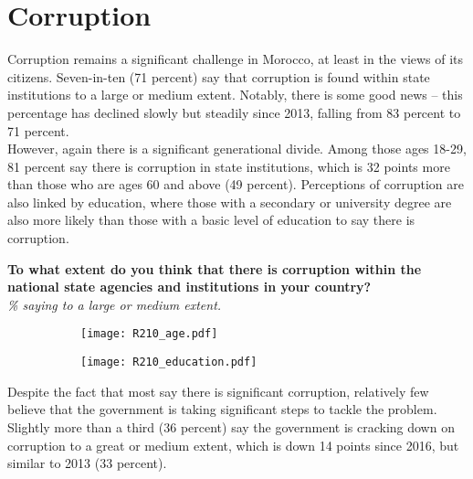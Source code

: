 \documentclass[12pt]{article}
\begin{document}
\section*{Corruption}

	\noindent Corruption remains a significant challenge in Morocco, at least in the views of its citizens. Seven-in-ten (71 percent) say that corruption is found within state institutions to a large or medium extent. Notably, there is some good news -- this percentage has declined slowly but steadily since 2013, falling from 83 percent to 71 percent.\\
	
	\noindent However, again there is a significant generational divide. Among those ages 18-29, 81 percent say there is corruption in state institutions, which is 32 points more than those who are ages 60 and above (49 percent). Perceptions of corruption are also linked by education, where those with a secondary or university degree are also more likely than those with a basic level of education to say there is corruption.
	
	\pagebreak
	\begin{center}
		{\textbf{To what extent do you think that there is corruption within the national state agencies and institutions in your country?}}\\
		\emph{\% saying to a large or medium extent.}
	\end{center}
	\begin{figure}[H]
		\hspace{-1cm}\begin{minipage}{0.5\linewidth}
			\begin{figure}[H]
				\centering
				\texttt{[image: R210\_age.pdf]} 
			\end{figure}
		\end{minipage}
		\begin{minipage}{0.4\linewidth}
			\begin{figure}[H]
				\texttt{[image: R210\_education.pdf]}
			\end{figure}
		\end{minipage}
	\end{figure}

	\noindent Despite the fact that most say there is significant corruption, relatively few believe that the government is taking significant steps to tackle the problem. Slightly more than a third (36 percent) say the government is cracking down on corruption to a great or medium extent, which is down 14 points since 2016, but similar to 2013 (33 percent).
	
\end{document}
